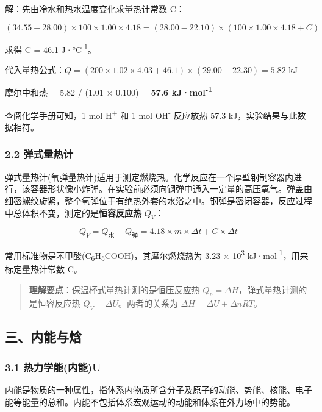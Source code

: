 \documentclass[a4paper,11pt]{ctexart}
\newcommand{\箭}{\ensuremath{\rightarrow}}
\newcommand{\左箭}{\ensuremath{\leftarrow}}
\newcommand{\上箭}{\ensuremath{\uparrow}}
\newcommand{\下箭}{\ensuremath{\downarrow}}
\newcommand{\衡}{\ensuremath{\rightleftharpoons}}
\newcommand{\双箭}{\ensuremath{\leftrightarrow}}
\newcommand{\约等于}{\ensuremath{\approx}}
\newcommand{\小于等于}{\ensuremath{\leq}}
\newcommand{\大于等于}{\ensuremath{\geq}}
\newcommand{\不等于}{\ensuremath{\neq}}
\newcommand{\西格马}{\ensuremath{\sigma}}
\newcommand{\派}{\ensuremath{\pi}}
\begin{document}
解：先由冷水和热水温度变化求量热计常数 C：

\[(34.55 - 28.00) \times 100 \times 1.00 \times 4.18 = (28.00 - 22.10) \times (100 \times 1.00 \times 4.18 + C)\]

求得 C = 46.1 J·°C\textsuperscript{-1}。

代入量热公式：\(Q = (200 \times 1.02 \times 4.03 + 46.1) \times (29.00 - 22.30) = 5.82\) kJ

摩尔中和热 = 5.82 / (1.01 × 0.100) = \textbf{57.6 kJ·mol\textsuperscript{-1}}

查阅化学手册可知，1 mol H\textsuperscript{+} 和 1 mol OH\textsuperscript{-} 反应放热 57.3 kJ，实验结果与此数据相符。

\subsubsection{2.2 弹式量热计}\label{ux5f39ux5f0fux91cfux70edux8ba1}

弹式量热计(氧弹量热计)适用于测定燃烧热。化学反应在一个厚壁钢制容器内进行，该容器形状像小炸弹。在实验前必须向钢弹中通入一定量的高压氧气。弹盖由细密螺纹旋紧，整个氧弹位于有绝热外套的水浴之中。钢弹是密闭容器，反应过程中总体积不变，测定的是\textbf{恒容反应热} \(Q_V\)：

\[
Q_V = Q_{\text{水}} + Q_{\text{弹}} = 4.18 \times m \times \Delta t + C \times \Delta t
\]

常用标准物是苯甲酸(C\textsubscript{6}H\textsubscript{5}COOH)，其摩尔燃烧热为 3.23 × 10\textsuperscript{3} kJ·mol\textsuperscript{-1}，用来标定量热计常数 C。

\begin{quote}
\textbf{理解要点}：保温杯式量热计测的是恒压反应热 \(Q_p = \Delta H\)，弹式量热计测的是恒容反应热 \(Q_V = \Delta U\)。两者的关系为 \(\Delta H = \Delta U + \Delta nRT\)。
\end{quote}

\subsection{三、内能与焓}\label{ux4e09ux5185ux80fdux4e0eux7113}

\subsubsection{3.1 热力学能(内能)U}\label{ux70edux529bux5b66ux80fdux5185ux80fdu}

内能是物质的一种属性，指体系内物质所含分子及原子的动能、势能、核能、电子能等能量的总和。内能不包括体系宏观运动的动能和体系在外力场中的势能。
\end{document}
